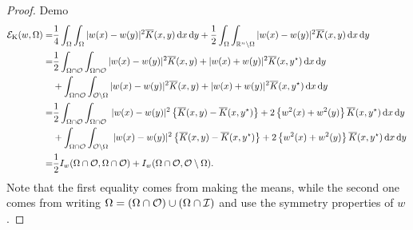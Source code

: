 \begin{proof}
Demo
\begin{align*}
\mathcal{E}_\mathrm{K}(w, \Omega) = & \frac{1}{4} \int_{\Omega} \int_{\Omega} |w(x)-w(y)|^2 \overline{K}(x,y) \,\mathrm{d} x \,\mathrm{d} y + \frac{1}{2} \int_{\Omega} \int_{\mathbb{R}^n \setminus \Omega} |w(x)-w(y)|^2 \overline{K}(x,y) \,\mathrm{d} x \,\mathrm{d} y \\
= & \frac{1}{2} \int_{\Omega\cap \mathcal{O}} \int_{\Omega \cap \mathcal{O}} |w(x)-w(y)|^2 \overline{K}(x,y) + |w(x)+w(y)|^2 \overline{K}(x,y^\star) \,\mathrm{d} x \,\mathrm{d} y  \\
& + \int_{\Omega\cap \mathcal{O}} \int_{\mathcal{O} \setminus \Omega} |w(x)-w(y)|^2 \overline{K}(x,y) + |w(x)+w(y)|^2 \overline{K}(x,y^\star) \,\mathrm{d} x \,\mathrm{d} y  \\
= & \frac{1}{2} \int_{\Omega\cap \mathcal{O}} \int_{\Omega \cap \mathcal{O}}  \ |w(x)-w(y)|^2 \left\{ \overline{K}(x,y) - \overline{K}(x,y^\star) \right\}  +2 \left\{w^2(x)+w^2(y)\right\} \overline{K}(x,y^\star) \,\mathrm{d} x \,\mathrm{d} y\,\\
&+ \int_{\Omega\cap \mathcal{O}} \int_{\mathcal{O} \setminus \Omega}  \ |w(x)-w(y)|^2 \left\{ \overline{K}(x,y) - \overline{K}(x,y^\star) \right\}  +2 \left\{w^2(x)+w^2(y)\right\} \overline{K}(x,y^\star) \,\mathrm{d} x \,\mathrm{d} y\,\\
= & \frac{1}{2} I_w(\Omega\cap\mathcal{O},\Omega\cap\mathcal{O}) + I_w(\Omega\cap\mathcal{O},\mathcal{O}\setminus\Omega).
\end{align*}
Note that the first equality comes from making the means, while the second one comes from writing
$\Omega = (\Omega\cap \mathcal{O}) \cup (\Omega\cap \mathcal{I})$ and use the symmetry properties of $w$.
\end{proof}

